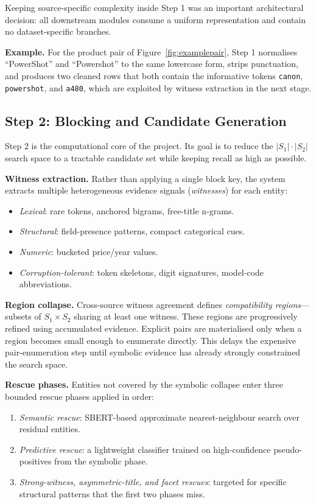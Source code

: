 \documentclass[10pt,twocolumn]{article}
\begin{document}
Keeping source-specific complexity inside Step 1 was an important
architectural decision: all downstream modules consume a uniform
representation and contain no dataset-specific branches.

\textbf{Example.} For the product pair of Figure~\ref{fig:examplepair},
Step 1 normalises ``PowerShot'' and ``Powershot'' to the same lowercase
form, strips punctuation, and produces two cleaned rows that both contain
the informative tokens \texttt{canon}, \texttt{powershot}, and \texttt{a480},
which are exploited by witness extraction in the next stage.

\subsection{Step 2: Blocking and Candidate Generation}

Step 2 is the computational core of the project. Its goal is to reduce
the $|S_1|\cdot|S_2|$ search space to a tractable candidate set while
keeping recall as high as possible.

\textbf{Witness extraction.}
Rather than applying a single block key, the system extracts multiple
heterogeneous evidence signals (\emph{witnesses}) for each entity:
\begin{itemize}
  \item \emph{Lexical}: rare tokens, anchored bigrams, free-title n-grams.
  \item \emph{Structural}: field-presence patterns, compact categorical cues.
  \item \emph{Numeric}: bucketed price/year values.
  \item \emph{Corruption-tolerant}: token skeletons, digit signatures,
    model-code abbreviations.
\end{itemize}

\textbf{Region collapse.}
Cross-source witness agreement defines \emph{compatibility regions}---subsets
of $S_1 \times S_2$ sharing at least one witness. These regions are
progressively refined using accumulated evidence. Explicit pairs are
materialised only when a region becomes small enough to enumerate directly.
This delays the expensive pair-enumeration step until symbolic evidence has
already strongly constrained the search space.

\textbf{Rescue phases.}
Entities not covered by the symbolic collapse enter three bounded rescue
phases applied in order:
\begin{enumerate}
  \item \emph{Semantic rescue}: SBERT-based approximate nearest-neighbour
    search over residual entities.
  \item \emph{Predictive rescue}: a lightweight classifier trained on
    high-confidence pseudo-positives from the symbolic phase.
  \item \emph{Strong-witness, asymmetric-title, and facet rescues}: targeted
    for specific structural patterns that the first two phases miss.
\end{enumerate}
\end{document}
